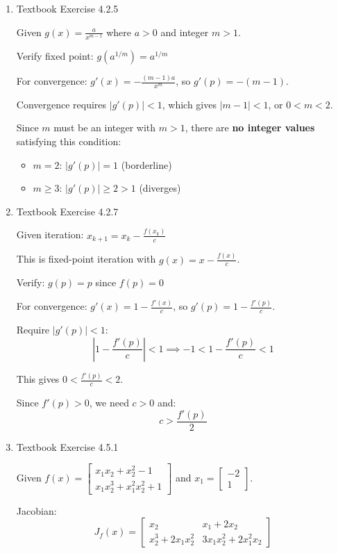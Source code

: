 \documentclass[reqno]{exam}
\begin{document}
\begin{enumerate}
\item Textbook Exercise 4.2.5
\begin{solution}
Given $g(x) = \frac{a}{x^{m-1}}$ where $a > 0$ and integer $m > 1$.

Verify fixed point: $g(a^{1/m}) = a^{1/m}$ \checkmark

For convergence: $g'(x) = -\frac{(m-1)a}{x^m}$, so $g'(p) = -(m-1)$.

Convergence requires $|g'(p)| < 1$, which gives $|m-1| < 1$, or $0 < m < 2$.

Since $m$ must be an integer with $m > 1$, there are \textbf{no integer values} satisfying this condition:
\begin{itemize}
\item $m = 2$: $|g'(p)| = 1$ (borderline)
\item $m \geq 3$: $|g'(p)| \geq 2 > 1$ (diverges)
\end{itemize}
\end{solution}

\item Textbook Exercise 4.2.7
\begin{solution}
Given iteration: $x_{k+1} = x_k - \frac{f(x_k)}{c}$

This is fixed-point iteration with $g(x) = x - \frac{f(x)}{c}$.

Verify: $g(p) = p$ since $f(p) = 0$ \checkmark

For convergence: $g'(x) = 1 - \frac{f'(x)}{c}$, so $g'(p) = 1 - \frac{f'(p)}{c}$.

Require $|g'(p)| < 1$:
$$\left|1 - \frac{f'(p)}{c}\right| < 1 \implies -1 < 1 - \frac{f'(p)}{c} < 1$$

This gives $0 < \frac{f'(p)}{c} < 2$.

Since $f'(p) > 0$, we need $c > 0$ and:
$$\boxed{c > \frac{f'(p)}{2}}$$
\end{solution}

\item Textbook Exercise 4.5.1
\begin{solution}
Given $f(x) = \begin{bmatrix} x_1 x_2 + x_2^2 - 1 \\ x_1 x_2^3 + x_1^2 x_2^2 + 1 \end{bmatrix}$ and $x_1 = \begin{bmatrix} -2 \\ 1 \end{bmatrix}$.

Jacobian:
$$J_f(x) = \begin{bmatrix} x_2 & x_1 + 2x_2 \\ x_2^3 + 2x_1 x_2^2 & 3x_1 x_2^2 + 2x_1^2 x_2 \end{bmatrix}$$


\end{solution}
\end{enumerate}
\end{document}
